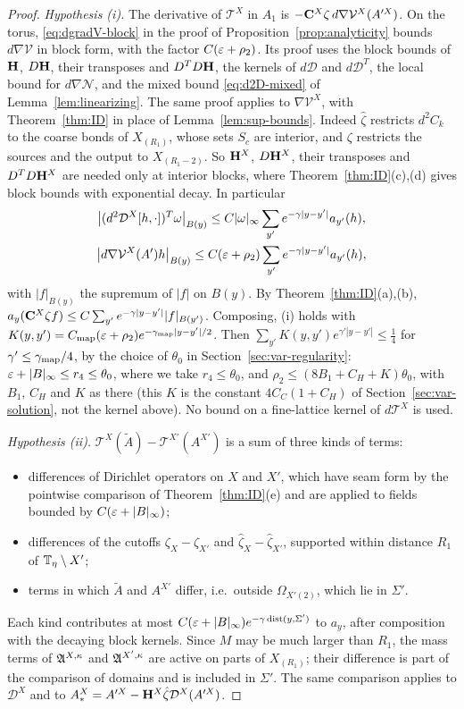 \begin{proof}
\emph{Hypothesis (i).} The derivative of $\mathcal T^X$ in $A_1$ is $-\mathbf C^X\zeta\,d\nabla\mathcal V^X(A'^X)$. On the torus, \eqref{eq:dgradV-block} in the proof of Proposition~\ref{prop:analyticity} bounds $d\nabla\mathcal V$ in block form, with the factor $C(\varepsilon+\rho_2)$. Its proof uses the block bounds of $\mathbf H$, $D\mathbf H$, their transposes and $D^TD\mathbf H$, the kernels of $d\mathcal D$ and $d\mathcal D^T$, the local bound for $d\nabla\mathcal N$, and the mixed bound \eqref{eq:d2D-mixed} of Lemma~\ref{lem:linearizing}. The same proof applies to $\nabla\mathcal V^X$, with Theorem~\ref{thm:ID} in place of Lemma~\ref{lem:sup-bounds}. Indeed $\hat\zeta$ restricts $d^2C_k$ to the coarse bonds of $X_{(R_1)}$, whose sets $S_c$ are interior, and $\zeta$ restricts the sources and the output to $X_{(R_1-2)}$. So $\mathbf H^X$, $D\mathbf H^X$, their transposes and $D^TD\mathbf H^X$ are needed only at interior blocks, where Theorem~\ref{thm:ID}(c),(d) gives block bounds with exponential decay. In particular
\begin{gather*}
\big|(d^2\mathcal D^X[h,\cdot])^T\omega\big|_{B(y)}\le C|\omega|_\infty\sum_{y'}e^{-\gamma|y-y'|}a_{y'}(h),\\
\big|d\nabla\mathcal V^X(A')h\big|_{B(y)}\le C(\varepsilon+\rho_2)\sum_{y'}e^{-\gamma|y-y'|}a_{y'}(h),
\end{gather*}
with $|f|_{B(y)}$ the supremum of $|f|$ on $B(y)$. By Theorem~\ref{thm:ID}(a),(b), $a_y(\mathbf C^X\zeta f)\le C\sum_{y'}e^{-\gamma|y-y'|}|f|_{B(y')}$. Composing, (i) holds with $K(y,y')=C_{\rm map}(\varepsilon+\rho_2)e^{-\gamma_{\rm map}|y-y'|/2}$. Then $\sum_{y'}K(y,y')e^{\gamma'|y-y'|}\le\frac14$ for $\gamma'\le\gamma_{\rm map}/4$, by the choice of $\theta_0$ in Section~\ref{sec:var-regularity}: $\varepsilon+|B|_\infty\le r_4\le\theta_0$, where we take $r_4\le\theta_0$, and $\rho_2\le(8B_1+C_H+K)\theta_0$, with $B_1$, $C_H$ and $K$ as there (this $K$ is the constant $4C_C(1+C_H)$ of Section~\ref{sec:var-solution}, not the kernel above). No bound on a fine-lattice kernel of $d\mathcal T^X$ is used.

\emph{Hypothesis (ii).} $\mathcal T^X(\tilde A)-\mathcal T^{X'}(A^{X'})$ is a sum of three kinds of terms:
\begin{itemize}
\item differences of Dirichlet operators on $X$ and $X'$, which have seam form by the pointwise comparison of Theorem~\ref{thm:ID}(e) and are applied to fields bounded by $C(\varepsilon+|B|_\infty)$;
\item differences of the cutoffs $\zeta_X-\zeta_{X'}$ and $\hat\zeta_X-\hat\zeta_{X'}$, supported within distance $R_1$ of $\mathbb T_\eta\setminus X'$;
\item terms in which $\tilde A$ and $A^{X'}$ differ, i.e.\ outside $\Omega_{X'(2)}$, which lie in $\Sigma'$.
\end{itemize}
Each kind contributes at most $C(\varepsilon+|B|_\infty)e^{-\gamma\operatorname{dist}(y,\Sigma')}$ to $a_y$, after composition with the decaying block kernels. Since $M$ may be much larger than $R_1$, the mass terms of $\mathfrak A^{X,\kappa}$ and $\mathfrak A^{X',\kappa}$ are active on parts of $X_{(R_1)}$; their difference is part of the comparison of domains and is included in $\Sigma'$. The same comparison applies to $\mathcal D^X$ and to $A^X_*=A'^X-\mathbf H^X\hat\zeta\mathcal D^X(A'^X)$.


\end{proof}
